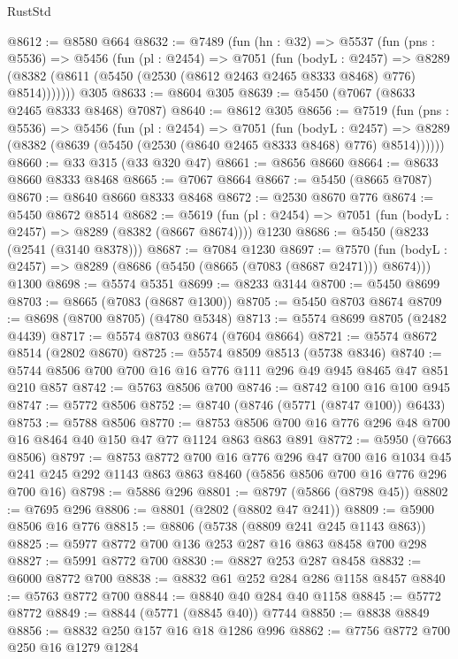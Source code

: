 \begin{lexlean}{RustStd}
\begin{coremodule}
@8612 := @8580 @664
@8632 := @7489
    (fun (hn : @32) =>
    @5537
      (fun (pns : @5536) =>
      @5456
        (fun (pl : @2454) =>
        @7051
          (fun (bodyL : @2457) =>
          @8289 (@8382 (@8611 (@5450 (@2530 (@8612 @2463 @2465 @8333 @8468) @776) @8514)))))))
    @305
@8633 := @8604 @305
@8639 := @5450 (@7067 (@8633 @2465 @8333 @8468) @7087)
@8640 := @8612 @305
@8656 := @7519
    (fun (pns : @5536) =>
    @5456
      (fun (pl : @2454) =>
      @7051
        (fun (bodyL : @2457) =>
        @8289 (@8382 (@8639 (@5450 (@2530 (@8640 @2465 @8333 @8468) @776) @8514))))))
@8660 := @33 @315 (@33 @320 @47)
@8661 := @8656 @8660
@8664 := @8633 @8660 @8333 @8468
@8665 := @7067 @8664
@8667 := @5450 (@8665 @7087)
@8670 := @8640 @8660 @8333 @8468
@8672 := @2530 @8670 @776
@8674 := @5450 @8672 @8514
@8682 := @5619
    (fun (pl : @2454) => @7051 (fun (bodyL : @2457) => @8289 (@8382 (@8667 @8674))))
    @1230
@8686 := @5450 (@8233 (@2541 (@3140 @8378)))
@8687 := @7084 @1230
@8697 := @7570
    (fun (bodyL : @2457) => @8289 (@8686 (@5450 (@8665 (@7083 (@8687 @2471))) @8674)))
    @1300
@8698 := @5574 @5351
@8699 := @8233 @3144
@8700 := @5450 @8699
@8703 := @8665 (@7083 (@8687 @1300))
@8705 := @5450 @8703 @8674
@8709 := @8698 (@8700 @8705) (@4780 @5348)
@8713 := @5574 @8699 @8705 (@2482 @4439)
@8717 := @5574 @8703 @8674 (@7604 @8664)
@8721 := @5574 @8672 @8514 (@2802 @8670)
@8725 := @5574 @8509 @8513 (@5738 @8346)
@8740 := @5744 @8506 @700 @700 @16 @16 @776 @111 @296 @49 @945 @8465 @47 @851 @210 @857
@8742 := @5763 @8506 @700
@8746 := @8742 @100 @16 @100 @945
@8747 := @5772 @8506
@8752 := @8740 (@8746 (@5771 (@8747 @100)) @6433)
@8753 := @5788 @8506
@8770 := @8753 @8506 @700 @16 @776 @296 @48 @700 @16 @8464 @40 @150 @47 @77 @1124 @863 @863 @891
@8772 := @5950 (@7663 @8506)
@8797 := @8753
    @8772
    @700
    @16
    @776
    @296
    @47
    @700
    @16
    @1034
    @45
    @241
    @245
    @292
    @1143
    @863
    @863
    @8460
    (@5856 @8506 @700 @16 @776 @296 @700 @16)
@8798 := @5886 @296
@8801 := @8797 (@5866 (@8798 @45))
@8802 := @7695 @296
@8806 := @8801 (@2802 (@8802 @47 @241))
@8809 := @5900 @8506 @16 @776
@8815 := @8806 (@5738 (@8809 @241 @245 @1143 @863))
@8825 := @5977 @8772 @700 @136 @253 @287 @16 @863 @8458 @700 @298
@8827 := @5991 @8772 @700
@8830 := @8827 @253 @287 @8458
@8832 := @6000 @8772 @700
@8838 := @8832 @61 @252 @284 @286 @1158 @8457
@8840 := @5763 @8772 @700
@8844 := @8840 @40 @284 @40 @1158
@8845 := @5772 @8772
@8849 := @8844 (@5771 (@8845 @40)) @7744
@8850 := @8838 @8849
@8856 := @8832 @250 @157 @16 @18 @1286 @996
@8862 := @7756 @8772 @700 @250 @16 @1279 @1284

\end{coremodule}
\end{lexlean}
